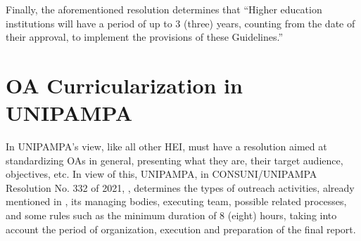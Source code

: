 
Finally, the aforementioned resolution determines that ``Higher education institutions will have a period of up to 3 (three) years, counting from the date of their approval, to implement the provisions of these Guidelines.''

\section{\acl{OA} Curricularization in \acl{UNIPAMPA}} \label{sec:3.2}



In \ac{UNIPAMPA}'s view, like all other \acl{HEI}, must have a resolution aimed at standardizing \acp{OA} in general, presenting what they are, their target audience, objectives, etc.
In view of this, \ac{UNIPAMPA}, in CONSUNI/UNIPAMPA Resolution No. 332 of 2021, \cite{Resolucao-332:2021}, determines the types of outreach activities, already mentioned in , its managing bodies, executing team, possible related processes, and some rules such as the minimum duration of 8 (eight) hours, taking into account the period of organization, execution and preparation of the final report.

